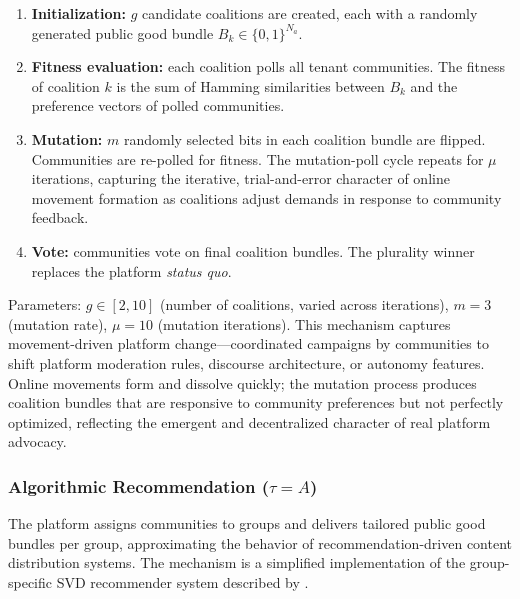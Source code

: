 \documentclass{article}
\begin{document}
\begin{enumerate}
    \item \textbf{Initialization:} $g$ candidate coalitions are created, each with a randomly generated public good bundle $B_k \in \{0,1\}^{N_a}$.
    \item \textbf{Fitness evaluation:} each coalition polls all tenant communities. The fitness of coalition $k$ is the sum of Hamming similarities between $B_k$ and the preference vectors of polled communities.
    \item \textbf{Mutation:} $m$ randomly selected bits in each coalition bundle are flipped. Communities are re-polled for fitness. The mutation-poll cycle repeats for $\mu$ iterations, capturing the iterative, trial-and-error character of online movement formation as coalitions adjust demands in response to community feedback.
    \item \textbf{Vote:} communities vote on final coalition bundles. The plurality winner replaces the platform \textit{status quo}.
\end{enumerate}

\noindent Parameters: $g \in [2,10]$ (number of coalitions, varied across iterations), $m = 3$ (mutation rate), $\mu = 10$ (mutation iterations). This mechanism captures movement-driven platform change---coordinated campaigns by communities to shift platform moderation rules, discourse architecture, or autonomy features. Online movements form and dissolve quickly; the mutation process produces coalition bundles that are responsive to community preferences but not perfectly optimized, reflecting the emergent and decentralized character of real platform advocacy.

\subsubsection{Algorithmic Recommendation ($\tau = A$)}

The platform assigns communities to groups and delivers tailored public good bundles per group, approximating the behavior of recommendation-driven content distribution systems. The mechanism is a simplified implementation of the group-specific SVD recommender system described by \cite{biGroupSpecificRecommenderSystem2017}.
\end{document}

